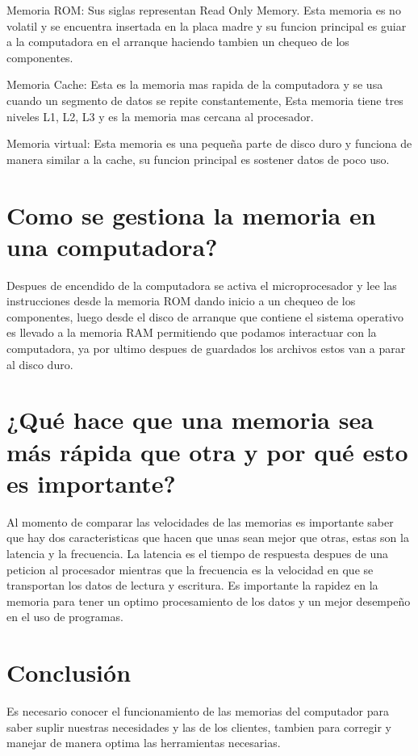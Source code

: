 \documentclass{article}
\begin{document}
Memoria ROM: Sus siglas representan Read Only Memory. Esta memoria es no volatil y se encuentra insertada en la placa madre y su funcion principal es guiar a la computadora en el arranque haciendo tambien un chequeo de los componentes.

Memoria Cache: Esta es la memoria mas rapida de la computadora y se usa cuando un segmento de datos se repite constantemente, Esta memoria tiene tres niveles L1, L2, L3 y es la memoria mas cercana al procesador.

Memoria virtual: Esta memoria es una pequeña parte de disco duro y funciona de manera similar a la cache, su funcion principal es sostener datos de poco uso.


\section{Como se gestiona la memoria en una computadora?} 
Despues de encendido de la computadora se activa el microprocesador y lee las instrucciones desde la memoria ROM dando inicio a un chequeo de los componentes, luego desde el disco de arranque que contiene el sistema operativo es llevado a la memoria RAM permitiendo que podamos interactuar con la computadora, ya por ultimo despues de guardados los archivos estos van a parar al disco duro.


\section{¿Qué hace que una memoria sea más rápida que otra y por qué esto es importante?}
Al momento de comparar las velocidades de las memorias es importante saber que hay dos caracteristicas que hacen que unas sean mejor que otras, estas son la latencia y la frecuencia. La latencia es el tiempo de respuesta despues de una peticion al procesador mientras que la frecuencia es la velocidad en que se transportan los datos de lectura y escritura. Es importante  la rapidez en la memoria para tener un optimo procesamiento de los datos y un mejor desempeño en el uso de programas.



\section{Conclusión} \label{conclulsion}
Es necesario conocer el funcionamiento de las memorias del computador para saber suplir nuestras necesidades y las de los clientes, tambien para corregir y manejar de manera optima las herramientas necesarias.



\cite{tecnologia+informatica}

\cite{Nociones de la memoria del computador}

\cite{computerhoy}
\end{document}
